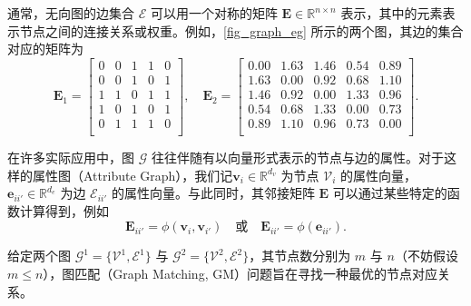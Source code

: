通常，无向图的边集合 $\mathcal E$ 可以用一个对称的矩阵 $\mathbf E \in \mathbb R^{n \times n}$ 表示，其中的元素表示节点之间的连接关系或权重。例如，\cref{fig_graph_eg} 所示的两个图，其边的集合对应的矩阵为
$$
    \mathbf{E}_1 =
    \begin{bmatrix}
        0 & 0 & 1 & 1 & 0 \\
        0 & 0 & 1 & 0 & 1 \\
        1 & 1 & 0 & 1 & 1 \\
        1 & 0 & 1 & 0 & 1 \\
        0 & 1 & 1 & 1 & 0 \\
    \end{bmatrix}, \quad \mathbf{E}_2 =
    \begin{bmatrix}
        0.00 & 1.63 & 1.46 & 0.54 & 0.89 \\
        1.63 & 0.00 & 0.92 & 0.68 & 1.10 \\
        1.46 & 0.92 & 0.00 & 1.33 & 0.96 \\
        0.54 & 0.68 & 1.33 & 0.00 & 0.73 \\
        0.89 & 1.10 & 0.96 & 0.73 & 0.00 \\
    \end{bmatrix}.
$$

在许多实际应用中，图 $\mathcal G$ 往往伴随有以向量形式表示的节点与边的属性。对于这样的属性图（Attribute Graph），我们记$\bm v_i \in \mathbb R^{d_v}$ 为节点 $\mathcal V_i$ 的属性向量，$\bm e_{ii'} \in \mathbb R^{d_e}$ 为边 $\mathcal E_{ii'}$ 的属性向量。与此同时，其邻接矩阵 $\mathbf{E}$ 可以通过某些特定的函数计算得到，例如
\[
    \mathbf{E}_{ii'} = \phi(\bm v_i, \bm v_{i'}) \quad \text{或} \quad \mathbf{E}_{ii'} = \phi(\bm e_{ii'}).
\]

给定两个图 $\mathcal G^1=\{\mathcal V^1, \mathcal E^1\}$ 与 $\mathcal G^2=\{\mathcal V^2, \mathcal E^2\}$，其节点数分别为 $m$ 与 $n$（不妨假设 $m \leq n$），图匹配（Graph Matching, GM）问题旨在寻找一种最优的节点对应关系。

